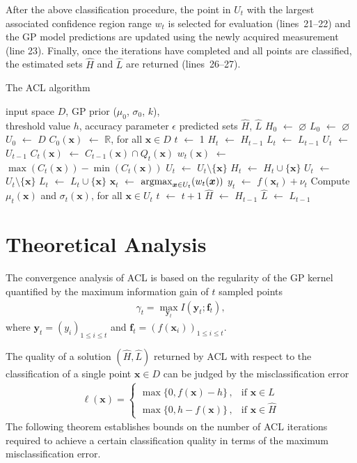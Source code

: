 \documentclass{article}
\def\*#1{\bm{#1}}
\newcommand*\LET[2]{\STATE #1 $\gets$ #2}
\newcommand{\argmax}{\operatornamewithlimits{argmax}}
\newcommand{\twopartdef}[4]
{
	\left\{
		\begin{array}{ll}
			#1\,,& \mbox{if } #2 \\
			#3\,,& \mbox{if } #4
		\end{array}
	\right.
}
\begin{document}
After the above classification procedure, the point in $U_t$
with the largest associated confidence region range $w_t$ is selected for
evaluation (lines~21--22) and the GP model predictions are updated using the
newly acquired measurement (line 23). Finally, once the iterations have
completed and all points are classified, the estimated sets $\hat{H}$ and
$\hat{L}$ are returned  (lines~26--27).

\begin{algorithm}[tb]
  \caption{The ACL algorithm}
  \label{alg:acl}
\begin{algorithmic}[1]
  \REQUIRE input space $D$, GP prior ($\mu_0$, $\sigma_0$, $k$),\\
           \hspace{1.9em}threshold value $h$, accuracy parameter $\epsilon$
  \ENSURE predicted sets $\hat{H}$, $\hat{L}$
  \LET{$H_0$}{$\varnothing$}
  \LET{$L_0$}{$\varnothing$}
  \LET{$U_0$}{$D$}
  \LET{$C_0(\*x)$}{$\mathbb{R}$, for all $\*x \in D$}
  \LET{$t$}{1}
    \LET{$H_t$}{$H_{t-1}$}
    \LET{$L_t$}{$L_{t-1}$}
    \LET{$U_t$}{$U_{t-1}$}
    \FORALL{$\*x \in U_{t-1}$}
      \LET{$C_{t}(\*x)$}{$C_{t-1}(\*x) \cap Q_t(\*x)$}
      \LET{$w_{t}(\*x)$}{$\max(C_{t}(\*x)) - \min(C_{t}(\*x))$}
      \IF{$\min(C_t(\*x)) + \epsilon \geq h$}
        \LET{$U_t$}{$U_t \setminus \{\*x\}$}
        \LET{$H_t$}{$H_t \cup \{\*x\}$}
      \ELSIF{$\max(C_t(\*x)) - \epsilon \leq h$}
        \LET{$U_t$}{$U_t \setminus \{\*x\}$}
        \LET{$L_t$}{$L_t \cup \{\*x\}$}
      \ENDIF
    \ENDFOR
    \LET{$\*x_t$}{$\argmax_{\*x \in U_t}(w_t(\*x))$}
    \LET{$y_t$}{$f(\*x_t) + \nu_t$}
    \STATE Compute $\mu_t(\*x)$ and $\sigma_t(\*x)$, for all $\*x \in U_t$
    \LET{$t$}{$t + 1$}
  \ENDWHILE
  \LET{$\hat{H}$}{$H_{t-1}$}
  \LET{$\hat{L}$}{$L_{t-1}$}
\end{algorithmic}
\end{algorithm}

\section{Theoretical Analysis}
The convergence analysis of ACL is based on the regularity of the GP kernel
quantified by the maximum information gain of $t$ sampled points
\begin{align*}
\gamma_t = \max_{\*y_t}I(\*y_t; \*f_t),
\end{align*}
where $\*y_t = (y_i)_{1\leq i\leq t}$ and
$\*f_t = (f(\*x_i))_{1\leq i\leq t}$.

The quality of a solution $(\hat{H}, \hat{L})$ returned by ACL with
respect to the classification of a single point $\*x \in D$ can be
judged by the misclassification error
\begin{align*}
\ell(\*x) = \twopartdef{\max\{0, f(\*x) - h\}}{\*x\in \hat{L}}{\max\{0, h - f(\*x)\}}{\*x\in \hat{H}}
\end{align*}
The following theorem establishes bounds on the number of ACL iterations
required to achieve a certain classification quality in terms of the
maximum misclassification error.
\end{document}
